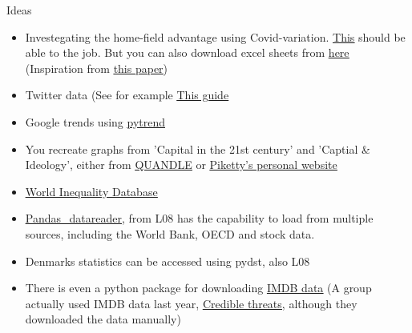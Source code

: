 \documentclass[10pt,danish,t,10pt]{beamer}
\begin{document}
\begin{frame}{Ideas}
    \begin{itemize}
        \item Investegating the home-field advantage using Covid-variation. \href{https://understat.readthedocs.io/en/latest/}{\underline{This}} should be able to the job. But you can also download excel sheets from \href{https://www.football-data.co.uk/data.php}{\underline{here}} (Inspiration from \href{http://ftp.iza.org/dp13578.pdf}{\underline{this paper}})
        \item Twitter data (See for example \href{https://www.toptal.com/python/twitter-data-mining-using-python}{\underline{This guide}}
        \item Google trends using \href{https://towardsdatascience.com/google-trends-api-for-python-a84bc25db88f}{\underline{pytrend}}
        \item You recreate graphs from 'Capital in the 21st century' and 'Captial \& Ideology', either from  \href{https://www.quandl.com/data/PIKETTY-Thomas-Piketty}{\underline{QUANDLE}} or \href{http://piketty.pse.ens.fr/en/ideology}{\underline{Piketty's personal website}}
        \item \href{https://wid.world/data/}{\underline{World Inequality Database}}
        \item \href{https://pandas-datareader.readthedocs.io/en/latest/remote_data.html}{\underline{Pandas\_datareader}}, from L08 has the capability to load from multiple sources, including the World Bank, OECD and stock data. 
        \item Denmarks statistics can be accessed using pydst, also L08
        \item There is even a python package for downloading \href{https://imdbpy.github.io/}{\underline{IMDB data}} (A group actually used IMDB data last year, \href{https://github.com/NumEconCopenhagen/projects-2019-credible-threats/tree/master/dataproject}{\underline{Credible threats}}, although they downloaded the data manually)
    \end{itemize}
\end{frame}
\end{document}
